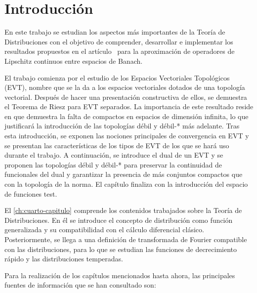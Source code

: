 %


\chapter{Introducción}

En este trabajo se estudian los aspectos más importantes de la Teoría de Distribuciones con el objetivo de comprender, desarrollar e implementar los resultados propuestos en el artículo~\cite{chen1995universal} para la aproximación de operadores de Lipschitz continuos entre espacios de Banach. 


El trabajo comienza por el estudio de los Espacios Vectoriales Topológicos (EVT), nombre que se la da a los espacios vectoriales dotados de una topología vectorial. Después de hacer una presentación constructiva de ellos, se demuestra el Teorema de Riesz para EVT separados. La importancia de este resultado reside en que demuestra la falta de compactos en espacios de dimensión infinita, lo que justificará la introducción de las topologías débil y débil-* más adelante. Tras esta introducción, se exponen las nociones principales de convergencia en EVT y se presentan las características de los tipos de EVT de los que se hará uso durante el trabajo. A continuación, se introduce el dual de un EVT y se proponen las topologías débil y débil-* para preservar la continuidad de funcionales del dual y garantizar la presencia de más conjuntos compactos que con la topología de la norma. El capítulo finaliza con la introducción del espacio de funciones test. 

El \autoref{ch:cuarto-capitulo} comprende los contenidos trabajados sobre la Teoría de Distribuciones. En él se introduce el concepto de distribución como función generalizada y su compatibilidad con el cálculo diferencial clásico. Posteriormente, se llega a una definición de transformada de Fourier compatible con las distribuciones, para lo que se estudian las funciones de decrecimiento rápido y las distribuciones temperadas. 

Para la realización de los capítulos mencionados hasta ahora, las principales fuentes de información que se han consultado son: 

